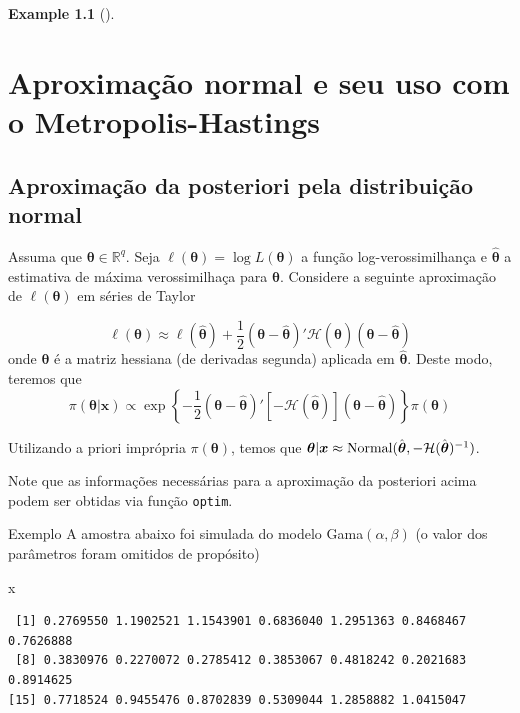 \documentclass[
  letterpaper,
  DIV=11,
  numbers=noendperiod]{scrreprt}
\newenvironment{Shaded}{\begin{snugshade}}{\end{snugshade}}
\newcommand{\NormalTok}[1]{\textcolor[rgb]{0.00,0.23,0.31}{#1}}
\theoremstyle{definition}
\theoremstyle{plain}
\theoremstyle{definition}
\newtheorem{example}{Example}[chapter]
\theoremstyle{remark}
\begin{document}
\begin{example}[]
\chapter{Aproximação normal e seu uso com o
Metropolis-Hastings}\label{aproximauxe7uxe3o-normal-e-seu-uso-com-o-metropolis-hastings}

\section{Aproximação da posteriori pela distribuição
normal}\label{aproximauxe7uxe3o-da-posteriori-pela-distribuiuxe7uxe3o-normal}

Assuma que \(\boldsymbol{\theta}\in\mathbb{R}^q\). Seja
\(\ell(\boldsymbol{\theta})=\log L(\boldsymbol{\theta})\) a função
log-verossimilhança e \(\hat{\boldsymbol{\theta}}\) a estimativa de
máxima verossimilhaça para \(\boldsymbol{\theta}\). Considere a seguinte
aproximação de \(\ell(\boldsymbol{\theta})\) em séries de Taylor

\[\ell(\boldsymbol{\theta})\approx  \ell(\hat{\boldsymbol{\theta}})+\frac{1}{2}(\boldsymbol{\theta}-\hat{\boldsymbol{\theta}})'\mathcal{H}(\hat{\boldsymbol{\theta}})(\boldsymbol{\theta}-\hat{\boldsymbol{\theta}})\]
onde \(\boldsymbol{\theta}\) é a matriz hessiana (de derivadas segunda)
aplicada em \(\hat{\boldsymbol{\theta}}\). Deste modo, teremos que
\[\pi(\boldsymbol{\theta}|\boldsymbol{x})\propto \exp\left\{-\frac{1}{2}(\boldsymbol{\theta}-\hat{\boldsymbol{\theta}})'\left[-\mathcal{H}(\hat{\boldsymbol{\theta}})\right](\boldsymbol{\theta}-\hat{\boldsymbol{\theta}})\right\}\pi(\boldsymbol{\theta})\]

Utilizando a priori imprópria \(\pi(\boldsymbol{\theta})\), temos que
\(\boldsymbol{\theta}|\boldsymbol{x}\approx \hbox{Normal}(\hat{\boldsymbol{\theta}},-\mathcal{H}(\hat{\boldsymbol{\theta}})^{-1})\).

Note que as informações necessárias para a aproximação da posteriori
acima podem ser obtidas via função \texttt{optim}.

Exemplo A amostra abaixo foi simulada do modelo Gama\((\alpha,\beta)\)
(o valor dos parâmetros foram omitidos de propósito)

\begin{Shaded}
\begin{Highlighting}[]
\NormalTok{x}
\end{Highlighting}
\end{Shaded}

\begin{verbatim}
 [1] 0.2769550 1.1902521 1.1543901 0.6836040 1.2951363 0.8468467 0.7626888
 [8] 0.3830976 0.2270072 0.2785412 0.3853067 0.4818242 0.2021683 0.8914625
[15] 0.7718524 0.9455476 0.8702839 0.5309044 1.2858882 1.0415047
\end{verbatim}


\end{example}
\end{document}
